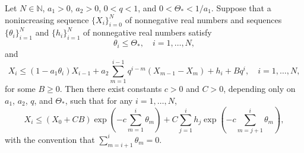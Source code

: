 \documentclass[10pt,a4paper]{amsart}
\begin{document}
\begin{lemma}\label{lem-iteration}
Let $N \in \mathbb{N}$, $a_1>0$, $a_2>0$, $0<q<1$, and $0<\Theta_{\ast} < 1/a_1$. Suppose that a nonincreasing sequence $\{X_i\}_{i=0}^{N}$ of nonnegative real numbers and sequences $\{\theta_i\}_{i=1}^N$ and $\{h_i\}_{i=1}^N$ of nonnegative real numbers satisfy
\begin{equation*}
\theta_i\leq\Theta_\ast, \quad i=1,\dots,N,
\end{equation*}
and
\begin{equation}\label{eq-technical}
X_i \leq (1-a_1\theta_i)X_{i-1}+a_2\sum_{m=1}^{i-1}q^{i-m}(X_{m-1}-X_m) +h_i+Bq^i, \quad i=1, \dots, N,
\end{equation}
for some $B \geq 0$. Then there exist constants $c>0$ and $C>0$, depending only on $a_1$, $a_2$, $q$, and $\Theta_{\ast}$, such that for any $i=1, \dots, N$,
\begin{equation*}
X_i \leq (X_0+CB)\exp\left(-c\sum_{m=1}^{i}\theta_m\right)+C\sum_{j=1}^ih_j\exp\left(-c\sum_{m=j+1}^{i}\theta_m\right),
\end{equation*}
with the convention that $\sum_{m=i+1}^i \theta_m=0$.
\end{lemma}
\end{document}
